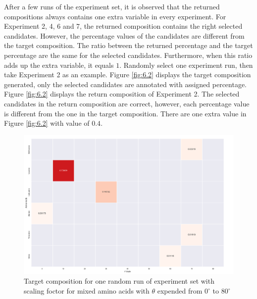 After a few runs of the experiment set, it is observed that the returned compositions always contains one extra variable in every experiment. For Experiment 2, 4, 6 and 7, the returned composition contains the right selected candidates. However, the percentage values of the candidates are different from the target composition. The ratio between the returned percentage and the target percentage are the same for the selected candidates. Furthermore, when this ratio adds up the extra variable, it equals $1$. Randomly select one experiment run, then take Experiment 2 as an example. Figure \ref{fig:6.2} displays the target composition generated, only the selected candidates are annotated with assigned percentage. Figure \ref{fig:6.2} displays the return composition of Experiment 2. The selected candidates in the return composition are correct, however, each percentage value is different from the one in the target composition. There are one extra value in Figure \ref{fig:6.2} with value of $0.4$. \\

\begin{figure}[!ht] 
\centering
\includegraphics[scale=0.4]{Figures/chapter6_figure_one.png}
\caption{Target composition for one random run of experiment set with scaling foctor for mixed amino acids with $\theta$ expended from $0^{\circ}$ to $80^{\circ}$} \label{fig:6.1}
\end{figure}

